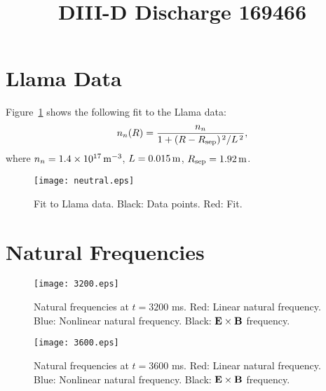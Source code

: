 \documentclass[12pt]{article}
\title{\bf DIII-D Discharge 169466}
\date{}
\author{}
\begin{document}
\maketitle

\section{Llama Data}
Figure~\ref{fig1} shows the following fit to the Llama data:
\begin{equation}
n_n(R) = \frac{n_n}{1+(R-R_{\rm sep})^{\,2}/L^{\,2}},
\end{equation}
where $n_n = 1.4\times 10^{17}\,{\rm m}^{-3}$, $L= 0.015\,{\rm m}$, $R_{\rm sep}= 1.92\,{\rm m}$. 

\begin{figure}[h]
\centering
\texttt{[image: neutral.eps]}
\caption{Fit to Llama data. Black: Data points. Red: Fit.}\label{fig1}
\end{figure}

\section{Natural Frequencies}
\begin{figure}
\centering
\texttt{[image: 3200.eps]}
\caption{Natural frequencies at $t=3200$ ms. Red: Linear natural frequency. Blue: Nonlinear natural frequency. Black: ${\bf E}\times {\bf B}$ frequency.}\label{fig2}
\end{figure}

\begin{figure}
\centering
\texttt{[image: 3600.eps]}
\caption{Natural frequencies at $t=3600$ ms. Red: Linear natural frequency. Blue: Nonlinear natural frequency. Black: ${\bf E}\times {\bf B}$ frequency.}\label{fig3}
\end{figure}
\end{document}
